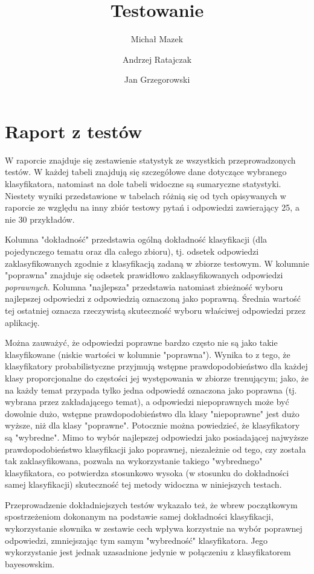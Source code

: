 \documentclass[notitlepage,leqno,fleqn,a4paper]{article}
\title{Testowanie}
\author{Michał Mazek \and Andrzej Ratajczak \and Jan Grzegorowski}
\begin{document}
\maketitle

\fontsize{13}{15}
\selectfont

\section{Raport z testów}
W raporcie znajduje się zestawienie statystyk ze wszystkich przeprowadzonych testów.
W każdej tabeli znajdują się szczegółowe dane dotyczące wybranego klasyfikatora, natomiast
na dole tabeli widoczne są sumaryczne statystyki.
Niestety wyniki przedstawione w tabelach różnią się od tych opisywanych w raporcie ze względu
na inny zbiór testowy pytań i odpowiedzi zawierający 25, a nie 30 przykładów.

Kolumna "dokładność" przedstawia ogólną dokładność klasyfikacji (dla pojedynczego tematu oraz dla całego zbioru), tj. odsetek odpowiedzi zaklasyfikowanych zgodnie z klasyfikacją zadaną w zbiorze testowym. W kolumnie "poprawna" znajduje się odsetek prawidłowo zaklasyfikowanych odpowiedzi \emph{poprawnych}. Kolumna "najlepsza" przedstawia natomiast zbieżność wyboru najlepszej odpowiedzi z odpowiedzią oznaczoną jako poprawną. Średnia wartość tej ostatniej oznacza rzeczywistą skuteczność wyboru właściwej odpowiedzi przez aplikację.

Można zauważyć, że odpowiedzi poprawne bardzo często nie są jako takie klasyfikowane (niskie wartości w kolumnie "poprawna"). Wynika to z tego, że klasyfikatory probabilistyczne przyjmują wstępne prawdopodobieństwo dla każdej klasy proporcjonalne do częstości jej występowania w zbiorze trenującym; jako, że na każdy temat przypada tylko jedna odpowiedź oznaczona jako poprawna (tj. wybrana przez zakładającego temat), a odpowiedzi niepoprawnych może być dowolnie dużo, wstępne prawdopodobieństwo dla klasy "niepoprawne" jest dużo wyższe, niż dla klasy "poprawne". Potocznie można powiedzieć, że klasyfikatory są "wybredne". Mimo to wybór najlepszej odpowiedzi jako posiadającej najwyższe prawdopodobieństwo klasyfikacji jako poprawnej, niezależnie od tego, czy została tak zaklasyfikowana, pozwala na wykorzystanie takiego "wybrednego" klasyfikatora, co potwierdza stosunkowo wysoka (w stosunku do dokładności samej klasyfikacji) skuteczność tej metody widoczna w niniejszych testach.

Przeprowadzenie dokładniejszych testów wykazało też, że wbrew początkowym spostrzeżeniom dokonanym na podstawie samej dokładności klasyfikacji, wykorzystanie słownika w zestawie cech wpływa korzystnie na wybór poprawnej odpowiedzi, zmniejszając tym samym "wybredność" klasyfikatora. Jego wykorzystanie jest jednak uzasadnione jedynie w połączeniu z klasyfikatorem bayesowskim.
\end{document}
